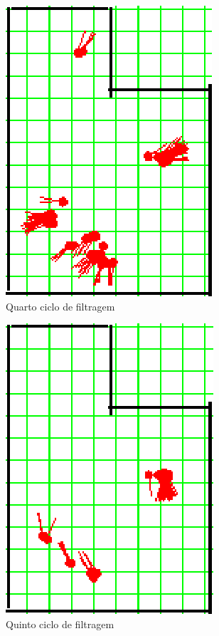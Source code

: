 \begin{figure}[H]
  \centering
  \includegraphics[scale=1]{figuras/cen4_ex1/5.eps}
  \caption[Quarto Ciclo de Filtragem]{Quarto ciclo de filtragem}
  \label{img:cen4_ex1_5}
\end{figure}

\begin{figure}[H]
  \centering
  \includegraphics[scale=1]{figuras/cen4_ex1/6.eps}
  \caption[Quinto Ciclo de Filtragem]{Quinto ciclo de filtragem}
  \label{img:cen4_ex1_6}
\end{figure}

